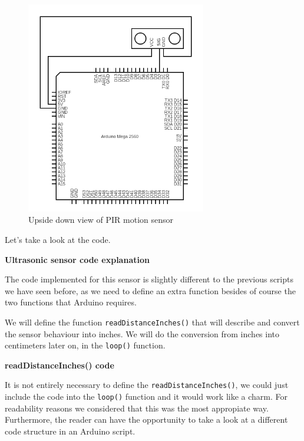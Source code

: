 \begin{figure}[H]
    \centering
    \includegraphics[width=0.7\textwidth]{fig/ultrasonic-scheme-circuit.png}
    \caption{Upside down view of PIR motion sensor}
    \label{fig:ultrasonic-scheme-circuit}
\end{figure}

\vspace{7mm}
Let's take a look at the code.




\textbf{Ultrasonic sensor code explanation}

The code implemented for this sensor is slightly different to the previous scripts we have seen before, as we need to define an extra function besides of course the two functions that Arduino requires.

We will define the function \verb|readDistanceInches()| that will describe and convert the sensor behaviour into inches. We will do the conversion from inches into centimeters later on, in the \verb|loop()| function.

\vspace{5mm}
\textbf{readDistanceInches() code}

It is not entirely necessary to define the \verb|readDistanceInches()|, we could just include the code into the \verb|loop()| function and it would work like a charm. For readability reasons we considered that this was the most appropiate way. Furthermore, the reader can have the opportunity to take a look at a different code structure in an Arduino script.


